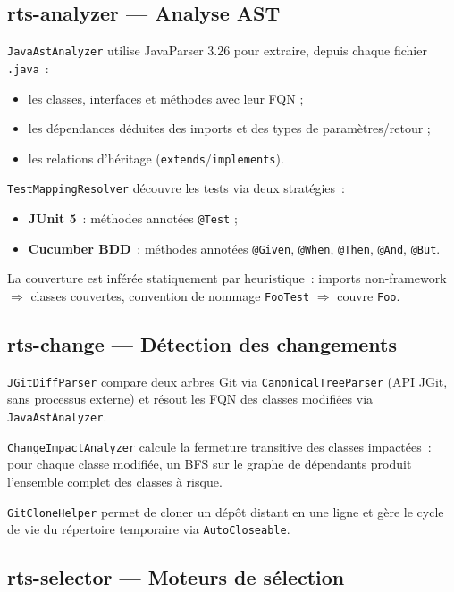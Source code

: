 \documentclass[12pt,a4paper]{article}
\begin{document}
\subsection{rts-analyzer — Analyse AST}

\texttt{JavaAstAnalyzer} utilise JavaParser 3.26 pour extraire, depuis chaque
fichier \texttt{.java}~:
\begin{itemize}[noitemsep]
  \item les classes, interfaces et méthodes avec leur FQN ;
  \item les dépendances déduites des imports et des types de paramètres/retour ;
  \item les relations d'héritage (\texttt{extends}/\texttt{implements}).
\end{itemize}

\texttt{TestMappingResolver} découvre les tests via deux stratégies~:
\begin{itemize}[noitemsep]
  \item \textbf{JUnit 5}~: méthodes annotées \texttt{@Test} ;
  \item \textbf{Cucumber BDD}~: méthodes annotées \texttt{@Given}, \texttt{@When},
        \texttt{@Then}, \texttt{@And}, \texttt{@But}.
\end{itemize}

La couverture est inférée statiquement par heuristique~: imports non-framework
$\Rightarrow$ classes couvertes, convention de nommage \texttt{FooTest} $\Rightarrow$
couvre \texttt{Foo}.

\subsection{rts-change — Détection des changements}

\texttt{JGitDiffParser} compare deux arbres Git via \texttt{CanonicalTreeParser}
(API JGit, sans processus externe) et résout les FQN des classes modifiées via
\texttt{JavaAstAnalyzer}.

\texttt{ChangeImpactAnalyzer} calcule la fermeture transitive des classes
impactées~: pour chaque classe modifiée, un BFS sur le graphe de dépendants
produit l'ensemble complet des classes à risque.

\texttt{GitCloneHelper} permet de cloner un dépôt distant en une ligne et gère
le cycle de vie du répertoire temporaire via \texttt{AutoCloseable}.

\subsection{rts-selector — Moteurs de sélection}
\end{document}
